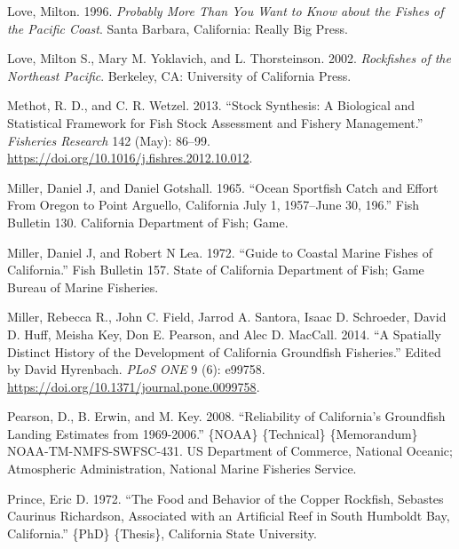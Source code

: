 \documentclass[11pt,
  english,
  letterpaper,
]{article}
\newlength{\cslhangindent}
\newenvironment{CSLReferences}[2] %
 {%
  \setlength{\parindent}{0pt}
  \ifodd #1 \everypar{\setlength{\hangindent}{\cslhangindent}}\ignorespaces\fi
  \ifnum #2 > 0
  \setlength{\parskip}{#2\baselineskip}
  \fi
 }%
 {}
\begin{document}
\begin{CSLReferences}{1}{0}
\leavevmode{}%
Love, Milton. 1996. \emph{Probably More Than You Want to Know about the Fishes of the {Pacific} {Coast}}. Santa Barbara, California: Really Big Press.

\leavevmode{}%
Love, Milton S., Mary M. Yoklavich, and L. Thorsteinson. 2002. \emph{Rockfishes of the {Northeast} {Pacific}}. Berkeley, CA: University of California Press.

\leavevmode{}%
Methot, R. D., and C. R. Wetzel. 2013. {``Stock Synthesis: A Biological and Statistical Framework for Fish Stock Assessment and Fishery Management.''} \emph{Fisheries Research} 142 (May): 86--99. \url{https://doi.org/10.1016/j.fishres.2012.10.012}.

\leavevmode{}%
Miller, Daniel J, and Daniel Gotshall. 1965. {``Ocean {Sportfish} {Catch} and {Effort} {From} {Oregon} to {Point} {Arguello}, {California} {July} 1, 1957--{June} 30, 196.''} Fish Bulletin 130. California Department of Fish; Game.

\leavevmode{}%
Miller, Daniel J, and Robert N Lea. 1972. {``Guide to Coastal {Marine} {Fishes} of {California}.''} Fish Bulletin 157. State of California Department of Fish; Game Bureau of Marine Fisheries.

\leavevmode{}%
Miller, Rebecca R., John C. Field, Jarrod A. Santora, Isaac D. Schroeder, David D. Huff, Meisha Key, Don E. Pearson, and Alec D. MacCall. 2014. {``A {Spatially} {Distinct} {History} of the {Development} of {California} {Groundfish} {Fisheries}.''} Edited by David Hyrenbach. \emph{PLoS ONE} 9 (6): e99758. \url{https://doi.org/10.1371/journal.pone.0099758}.

\leavevmode{}%
Pearson, D., B. Erwin, and M. Key. 2008. {``Reliability of {California}'s Groundfish Landing Estimates from 1969-2006.''} \{NOAA\} \{Technical\} \{Memorandum\} NOAA-TM-NMFS-SWFSC-431. US Department of Commerce, National Oceanic; Atmospheric Administration, National Marine Fisheries Service.

\leavevmode{}%
Prince, Eric D. 1972. {``The Food and Behavior of the Copper Rockfish, {Sebastes} Caurinus {Richardson}, Associated with an Artificial Reef in {South} {Humboldt} {Bay}, {California}.''} \{PhD\} \{Thesis\}, California State University.


\end{CSLReferences}
\end{document}

